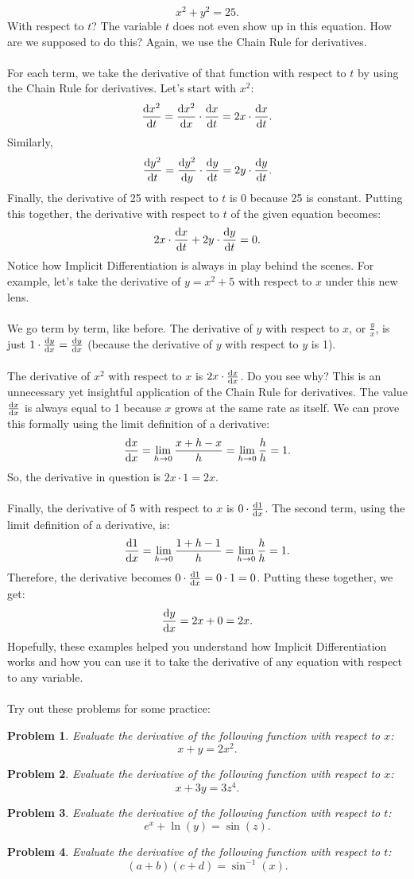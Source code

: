 \documentclass{article}
\newtheorem*{problem}{Problem}
\begin{document}
\[x^2+y^2=25.\]
With respect to $t$? The variable $t$ does not even show up in this equation. How are we supposed to do this? Again, we use the Chain Rule for derivatives. 
\\
\\
For each term, we take the derivative of that function with respect to $t$ by using the Chain Rule for derivatives. Let's start with $x^2$:
\[\diff{x^2}{t}=\diff{x^2}{x}\cdot \diff{x}{t}=2x\cdot \diff{x}{t}.\]
Similarly, 
\[\diff{y^2}{t}=\diff{y^2}{y}\cdot \diff{y}{t}=2y\cdot \diff{y}{t}.\]
Finally, the derivative of 25 with respect to $t$ is 0 because 25 is constant. Putting this together, the derivative with respect to $t$ of the given equation becomes: 
\[2x\cdot \diff{x}{t}+2y\cdot \diff{y}{t}=0.\]
Notice how Implicit Differentiation is always in play behind the scenes. For example, let's take the derivative of $y=x^2+5$ with respect to $x$ under this new lens.
\\
\\
We go term by term, like before. The derivative of $y$ with respect to $x$, or $\frac{y}{x}$, is just $1\cdot \diff{y}{x}=\diff{y}{x}$ (because the derivative of $y$ with respect to $y$ is 1). 
\\
\\
The derivative of $x^2$ with respect to $x$ is $2x\cdot \diff{x}{x}$. Do you see why? This is an unnecessary yet insightful application of the Chain Rule for derivatives. The value $\diff{x}{x}$ is always equal to 1 because $x$ grows at the same rate as itself. We can prove this formally using the limit definition of a derivative:
\[\diff{x}{x}=\lim_{h\to 0} \frac{x+h-x}{h}=\lim_{h\to 0} \frac{h}{h}=1.\]
So, the derivative in question is $2x\cdot 1=2x$.
\\
\\
Finally, the derivative of 5 with respect to $x$ is $0\cdot \diff{1}{x}$. The second term, using the limit definition of a derivative, is:
\[\diff{1}{x}=\lim_{h\to 0} \frac{1+h-1}{h}=\lim_{h\to 0} \frac{h}{h}=1.\]
Therefore, the derivative becomes $0\cdot \diff{1}{x}=0\cdot 1=0$. Putting these together, we get:
\[\diff{y}{x}=2x+0=2x.\]
Hopefully, these examples helped you understand how Implicit Differentiation works and how you can use it to take the derivative of any equation with respect to any variable.
\\
\\
Try out these problems for some practice:
\begin{problem}
Evaluate the derivative of the following function with respect to $x$:
\[x+y=2x^2.\]
\end{problem}
\begin{problem}
Evaluate the derivative of the following function with respect to $x$:
\[x+3y=3z^4.\]
\end{problem}
\begin{problem}
Evaluate the derivative of the following function with respect to $t$:
\[e^x+\ln(y)=\sin(z).\]
\end{problem}
\begin{problem}
Evaluate the derivative of the following function with respect to $t$:
\[(a+b)(c+d)=\sin^{-1}(x).\]
\end{problem}
\end{document}
